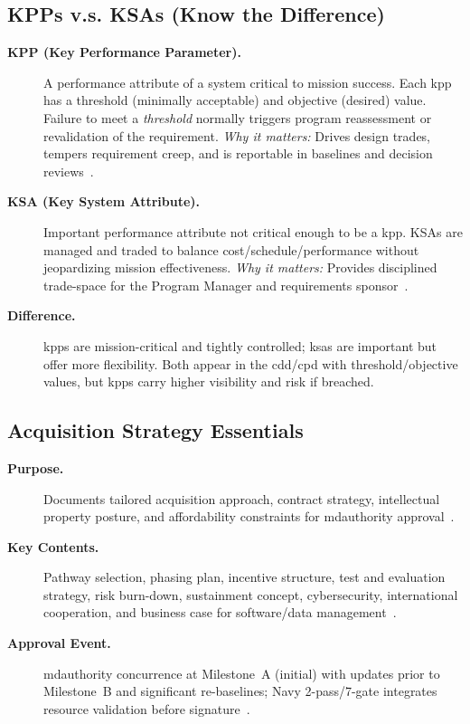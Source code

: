 \documentclass[../main.tex]{subfiles}
\begin{document}
\subsection{KPPs v.s. KSAs (Know the Difference)}
\begin{description}
  \item[\textbf{KPP (Key Performance Parameter).}] A performance attribute of a system critical to mission success. Each \ac{kpp} has a threshold (minimally acceptable) and objective (desired) value. Failure to meet a \emph{threshold} normally triggers program reassessment or revalidation of the requirement. \emph{Why it matters:} Drives design trades, tempers requirement creep, and is reportable in baselines and decision reviews~\autocite{CJCSI5123-01H}.
  \item[\textbf{KSA (Key System Attribute).}] Important performance attribute not critical enough to be a \ac{kpp}. KSAs are managed and traded to balance cost/schedule/performance without jeopardizing mission effectiveness. \emph{Why it matters:} Provides disciplined trade-space for the Program Manager and requirements sponsor~\autocite{CJCSI5123-01H}.
  \item[\textbf{Difference.}] \acp{kpp} are mission-critical and tightly controlled; \acp{ksa} are important but offer more flexibility. Both appear in the \ac{cdd}/\ac{cpd} with threshold/objective values, but \acp{kpp} carry higher visibility and risk if breached.
\end{description}

\subsection{Acquisition Strategy Essentials}
\begin{description}
  \item[\textbf{Purpose.}] Documents tailored acquisition approach, contract strategy, intellectual property posture, and affordability constraints for \ac{mdauthority} approval~\autocite{DoDI5000-85}.
  \item[\textbf{Key Contents.}] Pathway selection, phasing plan, incentive structure, test and evaluation strategy, risk burn-down, sustainment concept, cybersecurity, international cooperation, and business case for software/data management~\autocite{DoDI5000-85,DoDD5000-01}.
  \item[\textbf{Approval Event.}] \ac{mdauthority} concurrence at Milestone~A (initial) with updates prior to Milestone~B and significant re-baselines; Navy 2-pass/7-gate integrates resource validation before signature~\autocite{OPNAVINST5000-42E}.
\end{description}
\end{document}
